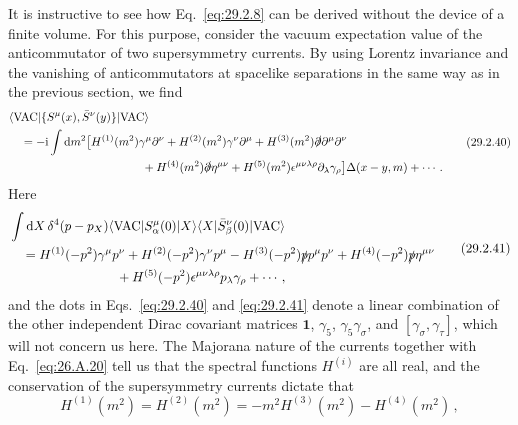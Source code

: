 It is instructive to see how Eq.~\eqref{eq:29.2.8} can be derived without
the device of a finite volume. For this purpose, consider the vacuum
expectation value of the anticommutator of two supersymmetry currents. By
using Lorentz invariance and the vanishing of anticommutators at spacelike
separations in the same way as in the previous section, we find
\begin{equation}
  \begin{aligned}
  &\langle\mathrm{VAC}\lvert
    \{S^\mu(x),\bar S^\nu(y)\}
  \rvert\mathrm{VAC}\rangle
  \\
  &\quad
  =-\ii\int \dd m^2
  \bigl[
    H^{(1)}(m^2)\gamma^\mu\partial^\nu
    +H^{(2)}(m^2)\gamma^\nu\partial^\mu
    +H^{(3)}(m^2)\sl{\partial}\partial^\mu\partial^\nu
  \\
  &\hspace{40mm}
    +H^{(4)}(m^2)\sl{\partial}\eta^{\mu\nu}
    +H^{(5)}(m^2)\epsilon^{\mu\nu\lambda\rho}
      \partial_\lambda\gamma_\rho
  \bigr]\Delta(x-y,m)
  +\cdots\,.
  \end{aligned}
  \tag{29.2.40}\label{eq:29.2.40}
\end{equation}
Here
\begin{equation}
  \begin{aligned}
  &\int \dd X\,\delta^4(p-p_X)
  \bra{\mathrm{VAC}} S^\mu_\alpha(0)\ket{X}
  \bra{X}\bar S^\nu_\beta(0)\ket{\mathrm{VAC}}
  \\
  &\quad
  =H^{(1)}(-p^2)\gamma^\mu p^\nu
  +H^{(2)}(-p^2)\gamma^\nu p^\mu
  -H^{(3)}(-p^2)\sl{p}p^\mu p^\nu
  +H^{(4)}(-p^2)\sl{p}\eta^{\mu\nu}
  \\
  &\hspace{29mm}
  +H^{(5)}(-p^2)\epsilon^{\mu\nu\lambda\rho}
    p_\lambda\gamma_\rho+\cdots\,,
  \end{aligned}
  \tag{29.2.41}\label{eq:29.2.41}
\end{equation}
and the dots in Eqs.~\eqref{eq:29.2.40} and \eqref{eq:29.2.41} denote a
linear combination of the other independent Dirac covariant matrices
\(\mathbf{1}\), \(\gamma_5\), \(\gamma_5\gamma_\sigma\), and
\([\gamma_\sigma,\gamma_\tau]\), which will not concern us here. The
Majorana nature of the currents together with Eq.~\eqref{eq:26.A.20}
tell us that the spectral functions \(H^{(i)}\) are all real, and the
conservation of the supersymmetry currents dictate that
\begin{equation}
  H^{(1)}(m^2)
  =H^{(2)}(m^2)
  =-m^2H^{(3)}(m^2)-H^{(4)}(m^2)\,,
  \tag{29.2.42}\label{eq:29.2.42}
\end{equation}
